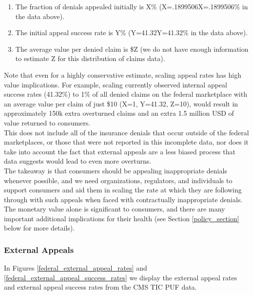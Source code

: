 \documentclass[psamsfonts]{amsart}
\theoremstyle{plain}
\theoremstyle{definition}
\theoremstyle{remark}
\begin{document}
\begin{enumerate}
\item The fraction of denials appealed initially is X\% (X=.1899506X=.1899506\% in the data above).
\item The initial appeal success rate is Y\% (Y=41.32Y=41.32\% in the data above).
\item The average value per denied claim is \$Z (we do not have enough information to estimate Z for this distribution of claims data).
\end{enumerate}

Note that even for a highly conservative estimate, scaling appeal rates has high value implications. For example, scaling currently observed internal appeal success rates (41.32\%) to 1\% of all denied claims on the federal marketplace with an average value per claim of just \$10 (X=1, Y=41.32, Z=10), would result in approximately 150k extra overturned claims and an extra 1.5 million USD of value returned to consumers.\\

This does not include all of the insurance denials that occur outside of the federal marketplaces, or those that were not reported in this incomplete data, nor does it take into account the fact that external appeals are a less biased process that data suggests would lead to even more overturns.\\

The takeaway is that consumers should be appealing inappropriate denials whenever possible, and we need organizations, regulators, and individuals to support consumers and aid them in scaling the rate at which they are following through with such appeals when faced with contractually inappropriate denials.\\

The monetary value alone is significant to consumers, and there are many important additional implications for their health (see Section \ref{policy_section} below for more details).\\


\subsubsection{External Appeals}

In Figures \ref{federal_external_appeal_rates} and \ref{federal_external_appeal_success_rates} we display the external appeal rates and external appeal success rates from the CMS TIC PUF data.\\
\end{document}
